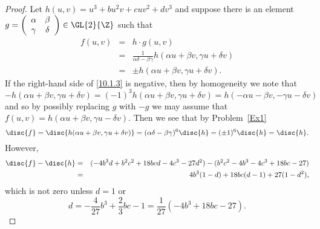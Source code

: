 \documentclass[10pt]{amsart}
\begin{document}
\begin{thm}
\begin{proof}
    Let $h(u,v) = u^3 + bu^2v + cuv^2 + dv^3$ and suppose there is an element $g = \left(\begin{array}{cc} \alpha & \beta\\ \gamma & \delta\end{array}\right) \in \GL{2}{\Z}$ such that 
      \begin{eqnarray}\label{10.1}
        f(u,v) &=& h \cdot g(u,v)\\
        &=& \frac{1}{\alpha\delta - \beta\gamma}h(\alpha u + \beta v, \gamma u + \delta v)\\ 
        &=& \pm h(\alpha u + \beta v, \gamma u + \delta v).\label{10.1.3}
      \end{eqnarray}
      If the right-hand side of \eqref{10.1.3} is negative, then by homogeneity we note that
      $$- h(\alpha u + \beta v, \gamma u + \delta v) = (-1)^3 h(\alpha u + \beta v, \gamma u + \delta v) = h(-\alpha u - \beta v, -\gamma u - \delta v)$$ and so by possibly replacing $g$ with $-g$ we may assume that $f(u,v) = h(\alpha u + \beta v, \gamma u - \delta v)$.
      Then we see that by Problem~\ref{Ex1}
      $$\disc{f} = \disc{h(\alpha u + \beta v, \gamma u + \delta v)} = (\alpha\delta - \beta\gamma)^6\disc{h} = (\pm 1)^6\disc{h} = \disc{h}.$$
      However,
      \begin{eqnarray*}
        \disc{f} - \disc{h} &=& (-4b^3 d + b^2c^2 + 18bcd - 4c^3 - 27d^2)
        - (b^2 c^2 - 4b^3 - 4c^3 + 18bc - 27)\\
        &=& 4b^3(1 - d) + 18bc(d - 1) + 27(1 - d^2),
      \end{eqnarray*}
      which is not zero unless $d = 1$ or 
      $$d = -\frac{4}{27}b^{3} + \frac{2}{3}bc - 1 = \frac{1}{27}(-4b^3 + 18bc - 27).$$
  \end{proof}
\end{thm}
\end{document}
